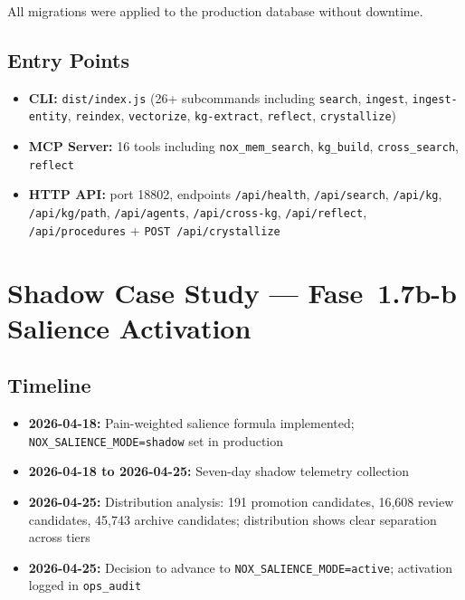 All migrations were applied to the production database without downtime.

\subsection{Entry Points}

\begin{itemize}
  \item \textbf{CLI:} \texttt{dist/index.js} (26+ subcommands including \texttt{search},
    \texttt{ingest}, \texttt{ingest-entity}, \texttt{reindex}, \texttt{vectorize},
    \texttt{kg-extract}, \texttt{reflect}, \texttt{crystallize})
  \item \textbf{MCP Server:} 16 tools including \texttt{nox\_mem\_search},
    \texttt{kg\_build}, \texttt{cross\_search}, \texttt{reflect}
  \item \textbf{HTTP API:} port 18802, endpoints
    \texttt{/api/health}, \texttt{/api/search}, \texttt{/api/kg},
    \texttt{/api/kg/path}, \texttt{/api/agents},
    \texttt{/api/cross-kg}, \texttt{/api/reflect},
    \texttt{/api/procedures} + \texttt{POST /api/crystallize}
\end{itemize}

\section{Shadow Case Study --- Fase~1.7b-b Salience Activation}

\subsection{Timeline}

\begin{itemize}
  \item \textbf{2026-04-18:} Pain-weighted salience formula implemented;
    \texttt{NOX\_SALIENCE\_MODE=shadow} set in production
  \item \textbf{2026-04-18 to 2026-04-25:} Seven-day shadow telemetry collection
  \item \textbf{2026-04-25:} Distribution analysis: 191 promotion candidates, 16,608
    review candidates, 45,743 archive candidates; distribution shows clear separation
    across tiers
  \item \textbf{2026-04-25:} Decision to advance to \texttt{NOX\_SALIENCE\_MODE=active};
    activation logged in \texttt{ops\_audit}
\end{itemize}


